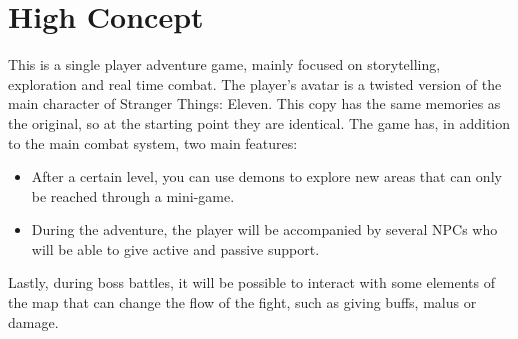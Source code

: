 \section{High Concept}

This is a single player adventure game, mainly focused on storytelling, exploration and real time combat. The player's avatar is a twisted version of the
main character of Stranger Things: Eleven. This copy has the same memories as the original, so at the starting point they are identical.
The game has, in addition to the main combat system, two main features:
\begin{itemize}
	\item After a certain level, you can use demons to explore new areas that can only be reached through a mini-game.
	\item During the adventure, the player will be accompanied by several NPCs who will be able to give active and passive support.

\end{itemize}
Lastly, during boss battles, it will be possible to interact with some elements of the map that can change the flow of the fight, such as giving buffs, malus or damage.
